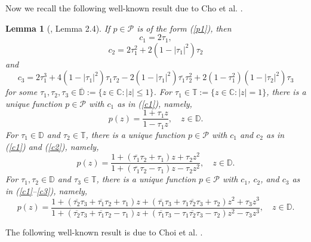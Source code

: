 \documentclass[11pt]{article}
\newtheorem{lem}{Lemma}[section]
\newcommand{\ol}{\overline}
\numberwithin{equation}{section}
\begin{document}
Now we recall the following well-known result due to Cho et al. \cite{C12}.

\begin{lem}[\cite{C12}, Lemma 2.4]\label{L1}
If $p\in\mathcal{P}$ is of the form (\ref{p1}), then
\begin{equation}\label{c1} c_1 =2\tau_1, \end{equation}
\begin{equation}\label{c2} c_2=2\tau_1^2 + 2(1 - |\tau_1|^2)\tau_2 \end{equation}
and
\begin{equation}\label{c3} c_3 = 2\tau_1^3+4(1-|\tau_1|^2)\tau_1\tau_2 - 2(1 - |\tau_1|^2)\ol{\tau_1}\tau_2^2 + 2(1 - \tau_1^2)(1 - |\tau_2|^2)\tau_3 \end{equation}
for some $\tau_1, \tau_2, \tau_3 \in\ol{\mathbb{D}}:= \{z \in \mathbb{C}: |z| \leq 1 \}$.
For $ \tau_1 \in \mathbb{T} := \{ z \in \mathbb{C} : |z| = 1 \} $, there is a unique function $ p \in \mathcal{P} $ with $ c_1 $ as in (\ref{c1}), namely,
\[
p(z) = \frac{1 + \tau_1 z}{1 - \tau_1 z}, \quad z \in \mathbb{D}.
\]
For $ \tau_1 \in \mathbb{D} $ and $ \tau_2 \in \mathbb{T} $, there is a unique function $ p \in \mathcal{P} $ with $ c_1 $ and $ c_2 $ as in (\ref{c1}) and (\ref{c2}), namely,
\[
p(z) = \frac{1 + (\ol{\tau_1} \tau_2 + \tau_1) z + \tau_2 z^2}{1 + (\ol{\tau_1} \tau_2 - \tau_1) z - \tau_2 z^2}, \quad z \in \mathbb{D}.
\]
For $ \tau_1, \tau_2 \in \mathbb{D} $ and $ \tau_3 \in \mathbb{T} $, there is a unique function $ p \in \mathcal{P} $ with $ c_1 $, $ c_2 $, and $ c_3 $ as in (\ref{c1}--\ref{c3}), namely,
\[
p(z) = \frac{1 + (\ol{\tau_2} \tau_3 + \ol{\tau_1} \tau_2 + \tau_1)z+(\ol{\tau_1}\tau_3+\tau_1\ol{\tau_2}\tau_3+\tau_2)z^2+\tau_3z^3}{1+(\ol{\tau_2}\tau_3+\ol{\tau_1}\tau_2-\tau_1)z+(\ol{\tau_1}\tau_3-\tau_1\ol{\tau_2}\tau_3-\tau_2)z^2-\tau_3z^3},\quad z\in\mathbb{D}.
\]
\end{lem}

The following well-known result is due to Choi et al. \cite{CKS1}.
\end{document}
